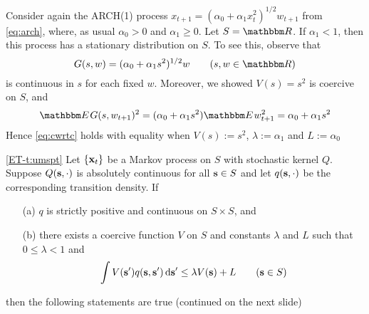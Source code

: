 \begin{frame}

    \vspace{2em}
    \Eg Consider again the ARCH(1) process $x_{t+1} = (\alpha_0 + \alpha_1
        x_t^2)^{1/2} w_{t+1}$ from \eqref{eq:arch}, where, as usual $\alpha_0 > 0$
        and $\alpha_1 \geq 0$.  Let $S = \RR$.  If $\alpha_1 < 1$, then
        this process has a stationary distribution on $S$.  To see this, observe
        that
        \begin{equation*}
            G(s, w) = (\alpha_0 + \alpha_1 s^2)^{1/2} w
            \qquad (s, w \in \RR)
        \end{equation*}
        is continuous in $s$ for each fixed $w$.  Moreover, we showed $V(s) = s^2$ is
        coercive on $S$, and 
        \begin{equation}
            \label{eq:archas}
            \EE G(s, w_{t+1})^2  
            = (\alpha_0 + \alpha_1 s^2) \EE w_{t+1}^2
            = \alpha_0 + \alpha_1 s^2
        \end{equation}
        Hence \eqref{eq:cwrtc} holds with equality when $V(s) :=s^2$, $\lambda :=\alpha_1$ and
        $L := \alpha_0$

\end{frame}

\begin{frame}
    
    \vspace{2em}
    \Thm\eqref{ET-t:umspt} 
    \label{t:umspt}
    Let $\{{\mathbf x}_t\}$ be a Markov process on $S$ with stochastic kernel $Q$.
    Suppose $Q({\mathbf s}, \cdot)$ is absolutely continuous for all ${\mathbf s}
    \in S$ and let $q({\mathbf s}, \cdot )$ be the corresponding transition
    density.  If
    \begin{enumerate}
        \item[(a)] $q$ is strictly positive and continuous on $S \times S$, and
        \item[(b)] there exists a coercive function $V$ on $S$ and 
            constants $\lambda$ and $L$ such that $0 \leq \lambda < 1$ and
            \begin{equation*}
                \int V({\mathbf s}') q({\mathbf s}, {\mathbf s}' ) \mathop{}\!\mathrm{d}  {\mathbf s}'
                \leq \lambda V({\mathbf s}) + L
                \qquad ({\mathbf s} \in S)
            \end{equation*}
    \end{enumerate}
    then the following statements are true (continued on the next slide)
    
\end{frame}

